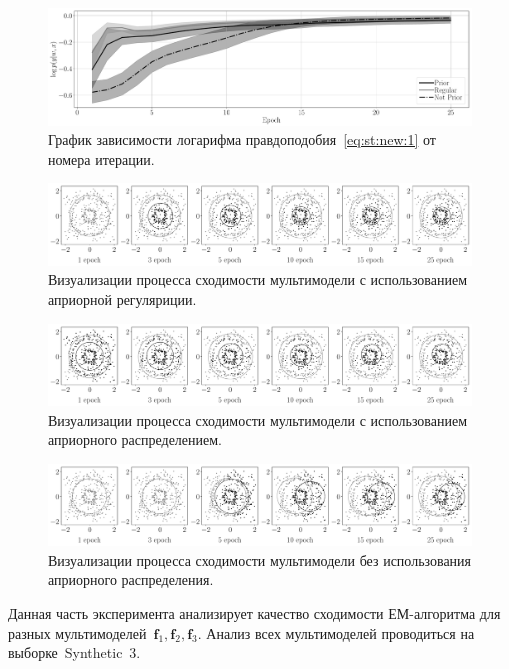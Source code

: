 \documentclass[12pt, twoside]{article}
\numberwithin{equation}{section}
\begin{document}
\begin{figure}[h!t]\center
\includegraphics[width=1\textwidth]{result_eng/experiment_synt_likelihood_progress}
\caption{График зависимости логарифма правдоподобия~\eqref{eq:st:new:1} от номера итерации.}
\label{experiment:st:2:2}
\end{figure}

\begin{figure}[h!t]\center
\includegraphics[width=1\textwidth]{result_eng/experiment_synt_regular_progress}
\caption{Визуализации процесса сходимости мультимодели с использованием априорной регуляриции.}
\label{experiment:st:2:3}
\end{figure}

\begin{figure}[h!t]\center
\includegraphics[width=1\textwidth]{result_eng/experiment_synt_prior_progress}
\caption{Визуализации процесса сходимости мультимодели с использованием априорного распределением.}
\label{experiment:st:2:4}
\end{figure}

\begin{figure}[h!t]\center
\includegraphics[width=1\textwidth]{result_eng/experiment_synt_not_prior_progress}
\caption{Визуализации процесса сходимости мультимодели без использования априорного распределения.}
\label{experiment:st:2:5}
\end{figure}
Данная часть эксперимента анализирует качество сходимости ЕМ-алгоритма для разных мультимоделей~$\textbf{f}_1, \textbf{f}_2, \textbf{f}_3$.
Анализ всех мультимоделей проводиться на выборке~Synthetic~3.
\end{document}
